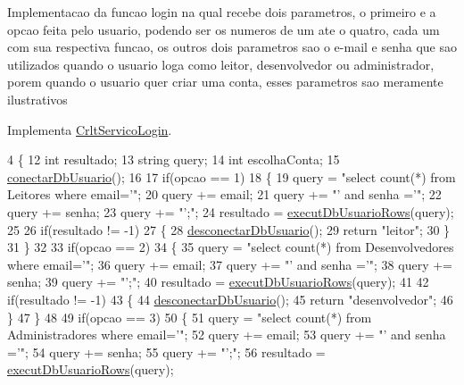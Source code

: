 Implementacao da funcao login na qual recebe dois parametros, o primeiro e a opcao feita pelo usuario, podendo ser os numeros de um ate o quatro, cada um com sua respectiva funcao, os outros dois parametros sao o e-\/mail e senha que sao utilizados quando o usuario loga como leitor, desenvolvedor ou administrador, porem quando o usuario quer criar uma conta, esses parametros sao meramente ilustrativos

Implementa \mbox{\hyperlink{class_crlt_servico_login_a3a863ed6ef16279d0cdc1d33fd8f5edd}{Crlt\+Servico\+Login}}.


\begin{DoxyCode}
4 \{
12   \textcolor{keywordtype}{int} resultado;
13   \textcolor{keywordtype}{string} query;
14   \textcolor{keywordtype}{int} escolhaConta;
15   \mbox{\hyperlink{comando_sql_8cpp_a4f89ddcbc4cf8f2587d89f72f8c7900d}{conectarDbUsuario}}();
16 
17   \textcolor{keywordflow}{if}(opcao == 1)
18   \{
19     query = \textcolor{stringliteral}{"select count(*) from Leitores where email='"};
20     query += email;
21     query += \textcolor{stringliteral}{"' and senha ='"};
22     query += senha;
23     query += \textcolor{stringliteral}{"';"};
24     resultado = \mbox{\hyperlink{comando_sql_8cpp_af54952694f2fa7d76f969fb74b853cb9}{executDbUsuarioRows}}(query);
25 
26     \textcolor{keywordflow}{if}(resultado != -1)
27     \{
28       \mbox{\hyperlink{comando_sql_8cpp_a969be9911913568e30d4ae8963338bc3}{desconectarDbUsuario}}();
29       \textcolor{keywordflow}{return} \textcolor{stringliteral}{"leitor"};
30     \}
31   \}
32 
33   \textcolor{keywordflow}{if}(opcao == 2)
34   \{
35     query = \textcolor{stringliteral}{"select count(*) from Desenvolvedores where email='"};
36     query += email;
37     query += \textcolor{stringliteral}{"' and senha ='"};
38     query += senha;
39     query += \textcolor{stringliteral}{"';"};
40     resultado = \mbox{\hyperlink{comando_sql_8cpp_af54952694f2fa7d76f969fb74b853cb9}{executDbUsuarioRows}}(query);
41 
42     \textcolor{keywordflow}{if}(resultado != -1)
43     \{
44       \mbox{\hyperlink{comando_sql_8cpp_a969be9911913568e30d4ae8963338bc3}{desconectarDbUsuario}}();
45       \textcolor{keywordflow}{return} \textcolor{stringliteral}{"desenvolvedor"};
46     \}
47   \}
48 
49   \textcolor{keywordflow}{if}(opcao == 3)
50   \{
51     query = \textcolor{stringliteral}{"select count(*) from Administradores where email='"};
52     query += email;
53     query += \textcolor{stringliteral}{"' and senha ='"};
54     query += senha;
55     query += \textcolor{stringliteral}{"';"};
56     resultado = \mbox{\hyperlink{comando_sql_8cpp_af54952694f2fa7d76f969fb74b853cb9}{executDbUsuarioRows}}(query);

\end{DoxyCode}
